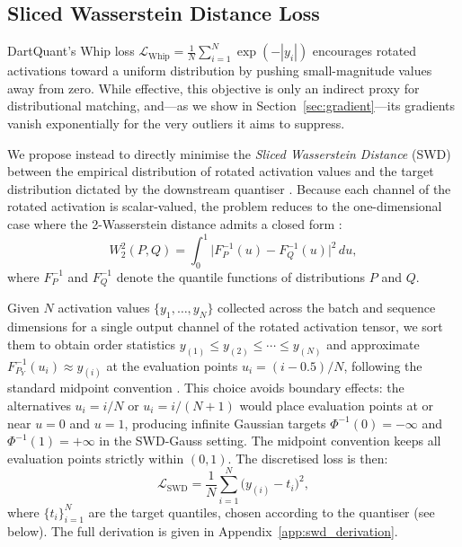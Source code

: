 \documentclass[11pt,a4paper]{article}
\begin{document}
\subsection{Sliced Wasserstein Distance Loss}
\label{sec:swd}

DartQuant's Whip loss $\mathcal{L}_{\text{Whip}} = \frac{1}{N}\sum_{i=1}^{N} \exp(-|y_i|)$ encourages rotated activations toward a uniform distribution by pushing small-magnitude values away from zero.
While effective, this objective is only an indirect proxy for distributional matching, and---as we show in Section~\ref{sec:gradient}---its gradients vanish exponentially for the very outliers it aims to suppress.

We propose instead to directly minimise the \emph{Sliced Wasserstein Distance} (SWD) between the empirical distribution of rotated activation values and the target distribution dictated by the downstream quantiser \cite{cuturi2013sinkhorn,blondel2020}.
Because each channel of the rotated activation is scalar-valued, the problem reduces to the one-dimensional case where the 2-Wasserstein distance admits a closed form \cite{wasserstein}:
\begin{equation}
\label{eq:w2}
W_2^2(P, Q) = \int_0^1 \bigl|F_P^{-1}(u) - F_Q^{-1}(u)\bigr|^2 \, du,
\end{equation}
where $F_P^{-1}$ and $F_Q^{-1}$ denote the quantile functions of distributions $P$ and $Q$.

Given $N$ activation values $\{y_1, \ldots, y_N\}$ collected across the batch and sequence dimensions for a single output channel of the rotated activation tensor, we sort them to obtain order statistics $y_{(1)} \leq y_{(2)} \leq \cdots \leq y_{(N)}$ and approximate $F_{P_Y}^{-1}(u_i) \approx y_{(i)}$ at the evaluation points $u_i = (i - 0.5) / N$, following the standard midpoint convention \cite{blom1958}.
This choice avoids boundary effects: the alternatives $u_i = i/N$ or $u_i = i/(N+1)$ would place evaluation points at or near $u = 0$ and $u = 1$, producing infinite Gaussian targets $\Phi^{-1}(0) = -\infty$ and $\Phi^{-1}(1) = +\infty$ in the SWD-Gauss setting.
The midpoint convention keeps all evaluation points strictly within $(0, 1)$.
The discretised loss is then:
\begin{equation}
\label{eq:swd_discrete}
\mathcal{L}_{\text{SWD}} = \frac{1}{N} \sum_{i=1}^{N} \bigl(y_{(i)} - t_i\bigr)^2,
\end{equation}
where $\{t_i\}_{i=1}^{N}$ are the target quantiles, chosen according to the quantiser (see below).
The full derivation is given in Appendix~\ref{app:swd_derivation}.
\end{document}
